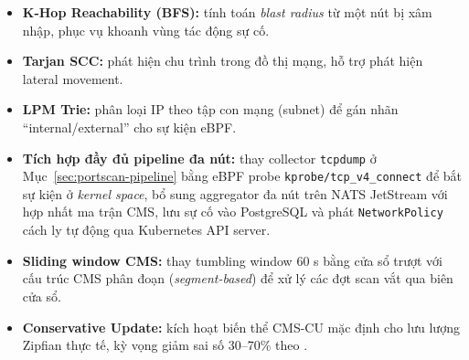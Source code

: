 \begin{itemize}
  \item \textbf{K-Hop Reachability (BFS):} tính toán \textit{blast radius} từ một nút bị xâm nhập, phục vụ khoanh vùng tác động sự cố.
  \item \textbf{Tarjan SCC:} phát hiện chu trình trong đồ thị mạng, hỗ trợ phát hiện lateral movement.
  \item \textbf{LPM Trie:} phân loại IP theo tập con mạng (subnet) để gán nhãn ``internal/external'' cho sự kiện eBPF.
  \item \textbf{Tích hợp đầy đủ pipeline đa nút:} thay collector \texttt{tcpdump} ở Mục~\ref{sec:portscan-pipeline} bằng eBPF probe \texttt{kprobe/tcp\_v4\_connect} để bắt sự kiện ở \textit{kernel space}, bổ sung aggregator đa nút trên NATS JetStream với hợp nhất ma trận CMS, lưu sự cố vào PostgreSQL và phát \texttt{NetworkPolicy} cách ly tự động qua Kubernetes API server.
  \item \textbf{Sliding window CMS:} thay tumbling window 60 s bằng cửa sổ trượt với cấu trúc CMS phân đoạn (\textit{segment-based}) để xử lý các đợt scan vắt qua biên cửa sổ.
  \item \textbf{Conservative Update:} kích hoạt biến thể CMS-CU mặc định cho lưu lượng Zipfian thực tế, kỳ vọng giảm sai số 30--70\% theo \cite{estan2003conservative}.
\end{itemize}
